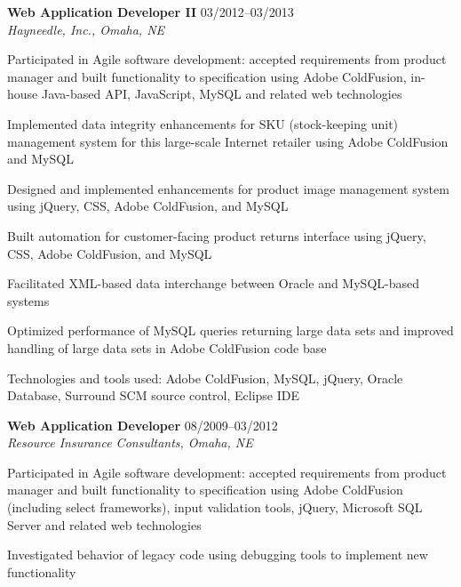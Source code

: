 \begin{itemize1}
	\item \textbf{Web Application Developer II} \textopenbullet{} 03/2012--03/2013 \\
		\textit{Hayneedle, Inc., Omaha, NE} \vspace{-1.5mm}
		\begin{itemize1}
			\item Participated in Agile software development: accepted requirements from product manager and built functionality to specification using Adobe ColdFusion, in-house Java-based API, JavaScript, MySQL and related web technologies
			\item Implemented data integrity enhancements for SKU (stock-keeping unit) management system for this large-scale Internet retailer using Adobe ColdFusion and MySQL
			\item Designed and implemented enhancements for product image management system using jQuery, CSS, Adobe ColdFusion, and MySQL
			\item Built automation for customer-facing product returns interface using jQuery, CSS, Adobe ColdFusion, and MySQL
			\item Facilitated XML-based data interchange between Oracle and MySQL-based systems
			\item Optimized performance of MySQL queries returning large data sets and improved handling of large data sets in Adobe ColdFusion code base
			\item Technologies and tools used: Adobe ColdFusion, MySQL, jQuery, Oracle Database, Surround SCM source control, Eclipse IDE
		\end{itemize1}
	\item \textbf{Web Application Developer} \textopenbullet{} 08/2009--03/2012 \\
		\textit{Resource Insurance Consultants, Omaha, NE} \vspace{-1.5mm}
		\begin{itemize1}
 			\item Participated in Agile software development: accepted requirements from product manager and built functionality to specification using Adobe ColdFusion (including select frameworks), input validation tools, jQuery, Microsoft SQL Server and related web technologies
 			\item Investigated behavior of legacy code using debugging tools to implement new functionality	

\end{itemize1}
\end{itemize1}
